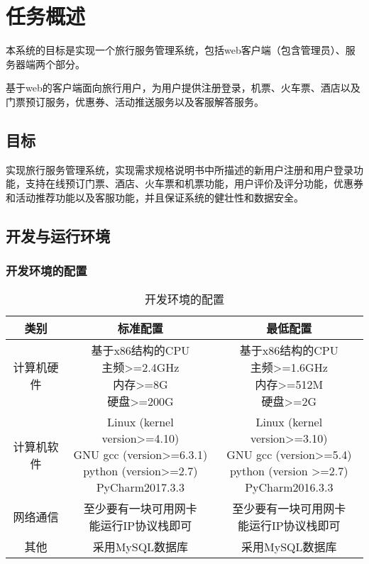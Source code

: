 \chapter{任务概述}
本系统的目标是实现一个旅行服务管理系统，包括web客户端（包含管理员）、服务器端两个部分。

基于web的客户端面向旅行用户，为用户提供注册登录，机票、火车票、酒店以及门票预订服务，优惠券、活动推送服务以及客服解答服务。

\section{目标}
实现旅行服务管理系统，实现需求规格说明书中所描述的新用户注册和用户登录功能，支持在线预订门票、酒店、火车票和机票功能，用户评价及评分功能，优惠券和活动推荐功能以及客服功能，并且保证系统的健壮性和数据安全。

\section{开发与运行环境}

\subsection{开发环境的配置}
\begin{table}[htbp]
\centering
\caption{开发环境的配置} \label{tab:development-environment}
\begin{tabular}{|c|c|c|}
    \hline
    类别 & 标准配置 & 最低配置 \\
    \hline
    计算机硬件 & \tabincell{c}{基于x86结构的CPU\\ 主频>=2.4GHz\\ 内存>=8G\\ 硬盘>=200G} & \tabincell{c}{基于x86结构的CPU\\ 主频>=1.6GHz\\ 内存>=512M\\ 硬盘>=2G} \\
    \hline
    计算机软件 & \tabincell{c}{Linux (kernel version>=4.10)\\ GNU gcc (version>=6.3.1) \\ python (version>=2.7) \\ PyCharm2017.3.3 } & \tabincell{c}{Linux (kernel version>=3.10)\\ GNU gcc (version>=5.4) \\ python (version >=2.7) \\ PyCharm2016.3.3 } \\
    \hline
    网络通信 & \tabincell{c}{至少要有一块可用网卡\\ 能运行IP协议栈即可} & \tabincell{c}{至少要有一块可用网卡\\ 能运行IP协议栈即可} \\
    \hline
    其他 & 采用MySQL数据库 & 采用MySQL数据库 \\
    \hline
\end{tabular}
\end{table}

